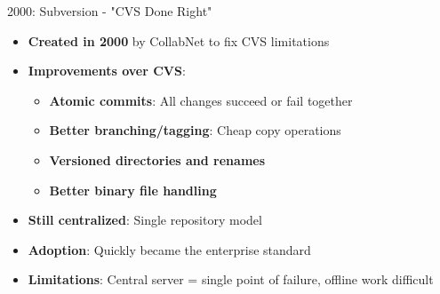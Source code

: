 \documentclass{beamer}
\begin{document}
\begin{frame}{2000: Subversion - "CVS Done Right"}
\begin{itemize}
    \item \textbf{Created in 2000} by CollabNet to fix CVS limitations
    \item \textbf{Improvements over CVS}:
        \begin{itemize}
            \item \textbf{Atomic commits}: All changes succeed or fail together
            \item \textbf{Better branching/tagging}: Cheap copy operations
            \item \textbf{Versioned directories and renames}
            \item \textbf{Better binary file handling}
        \end{itemize}
    \item \textbf{Still centralized}: Single repository model
    \item \textbf{Adoption}: Quickly became the enterprise standard
    \item \textbf{Limitations}: Central server = single point of failure, offline work difficult
\end{itemize}
\end{frame}
\end{document}

